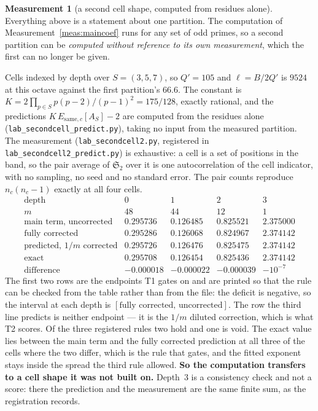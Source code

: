 \documentclass[11pt,a4paper]{article}
\theoremstyle{plain}
\theoremstyle{definition}
\newtheorem{measurement}[theorem]{Measurement}
\theoremstyle{remark}
\renewcommand{\SS}{\mathfrak{S}}
\begin{document}
\begin{measurement}[a second cell shape, computed from residues alone]\label{meas:secondcell}
Everything above is a statement about one partition. The computation
of Measurement~\ref{meas:maincoef} runs for any set of odd primes, so a
second partition can be \emph{computed without reference to its own
measurement}, which the first can no longer be given.

Cells indexed by depth over $S=(3,5,7)$, so $Q'=105$ and
$\ell=B/2Q'$ is $9524$ at this octave against the first partition's
$66.6$. The constant is $K=2\prod_{p\in S}p(p-2)/(p-1)^2=175/128$,
exactly rational, and the predictions
$K\,E_{\mathrm{same},c}[A_S]-2$ are computed from the residues alone
(\texttt{lab\_secondcell\_predict.py}), taking no input from the
measured partition. The measurement (\texttt{lab\_secondcell2.py},
registered in \texttt{lab\_secondcell2\_predict.py}) is exhaustive: a cell
is a set of
positions in the band, so the pair average of $\SS_2$ over it is one
autocorrelation of the cell indicator, with no sampling, no seed and no
standard error. The pair counts reproduce $n_c(n_c-1)$ exactly at all
four cells.
\[
\begin{array}{r|cccc}
 \text{depth} & 0 & 1 & 2 & 3\\\hline
 m & 48 & 44 & 12 & 1\\
 \text{main term, uncorrected} & 0.295736 & 0.126485 & 0.825521 & 2.375000\\
 \text{fully corrected} & 0.295286 & 0.126068 & 0.824967 & 2.374142\\
 \text{predicted, }1/m\text{ corrected} & 0.295726 & 0.126476 & 0.825475 & 2.374142\\
 \text{exact} & 0.295708 & 0.126454 & 0.825436 & 2.374142\\
 \text{difference} & -0.000018 & -0.000022 & -0.000039 & -10^{-7}
\end{array}
\]
The first two rows are the endpoints T1 gates on and are printed so
that the rule can be checked from the table rather than from the file:
the deficit is negative, so the interval at each depth is
$[\text{fully corrected},\,\text{uncorrected}]$. The row the third line
predicts is neither endpoint --- it is the $1/m$ diluted correction,
which is what T2 scores.
Of the three registered rules two hold and one is void. The exact
value lies between the main term and the fully corrected prediction at
all three of the cells where the two differ, which is the rule that
gates, and the fitted exponent stays inside the spread the third rule
allowed. \textbf{So the computation transfers to a cell shape it was
not built on.} Depth~$3$ is a
consistency check and not a score: there the prediction and the
measurement are the same finite sum, as the registration records.


\end{measurement}
\end{document}
